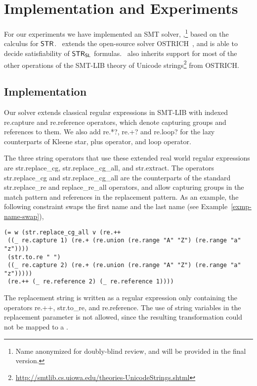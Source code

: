 
\section{Implementation and Experiments}
\label{sect:impl}

For our experiments we have implemented an SMT solver,
\ostrich,\footnote{Name anonymized for doubly-blind review, and will
  be provided in the final version.} based on the calculus for
$\mathsf{STR}$.  \ostrich\ extends the open-source solver
OSTRICH~\cite{CHL+19}, and is able to decide satisfiability of
$\mathsf{STR}_{\mathsf{SL}}$ formulas. \ostrich\ also inherits support for most of the
other operations of the SMT-LIB theory of Unicode
strings\footnote{\url{http://smtlib.cs.uiowa.edu/theories-UnicodeStrings.shtml}}
from OSTRICH.



\subsection{Implementation}

Our solver extends classical regular expressions in SMT-LIB
with indexed {\sf re.capture} and {\sf re.reference} operators, which
denote capturing groups and references to them. We also add {\sf
  re.*?}, {\sf re.+?} and {\sf re.loop?} for the lazy counterparts of
Kleene star, plus operator, and loop operator.

The three string operators that use these extended real world regular
expressions are {\sf str.replace\_cg}, {\sf str.replace\_cg\_all}, and
{\sf str.extract}. The operators {\sf str.replace\_cg} and {\sf
  str.replace\_cg\_all} are the counterparts of the standard {\sf
  str.replace\_re} and {\sf replace\_re\_all} operators, and allow
capturing groups in the match pattern and references in the
replacement pattern. As an example, the following constraint swaps the
first name and the last name (see Example~\ref{exmp-name-swap}),
%
{\small
\begin{verbatim}
(= w (str.replace_cg_all v (re.++  
 ((_ re.capture 1) (re.+ (re.union (re.range "A" "Z") (re.range "a" "z"))))
 (str.to.re " ") 
 ((_ re.capture 2) (re.+ (re.union (re.range "A" "Z") (re.range "a" "z")))))
 (re.++ (_ re.reference 2) (_ re.reference 1))))
\end{verbatim}
}
%
The replacement string is written as a regular expression only
containing the operators {\sf re.++}, {\sf str.to\_re}, and {\sf
  re.reference}. The use of string variables in the replacement
parameter is not allowed, since the resulting transformation could
not be mapped to a \PSST.

